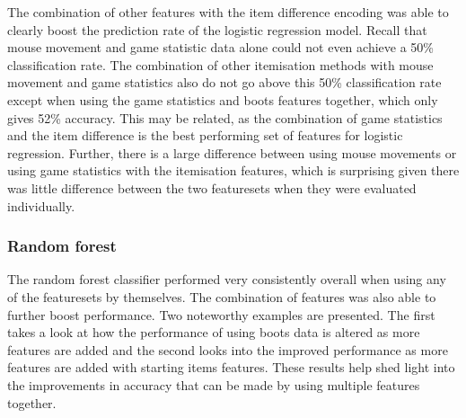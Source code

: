 \documentclass[Report.tex]{subfiles}
\begin{document}
The combination of other features with the item difference encoding was able to clearly boost the prediction rate of the logistic regression model. Recall that mouse movement and game statistic data alone could not even achieve a 50\% classification rate. The combination of other itemisation methods with mouse movement and game statistics also do not go above this 50\% classification rate except when using the game statistics and boots features together, which only gives 52\% accuracy. This may be related, as the combination of game statistics and the item difference is the best performing set of features for logistic regression. Further, there is a large difference between using mouse movements or using game statistics with the itemisation features, which is surprising given there was little difference between the two featuresets when they were evaluated individually. 



\subsubsection{Random forest}

The random forest classifier performed very consistently overall when using any of the featuresets by themselves. The combination of features was also able to further boost performance. Two noteworthy examples are presented. The first takes a look at how the performance of using boots data is altered as more features are added and the second looks into the improved performance as more features are added with starting items features. These results help shed light into the improvements in accuracy that can be made by using multiple features together.
\end{document}
